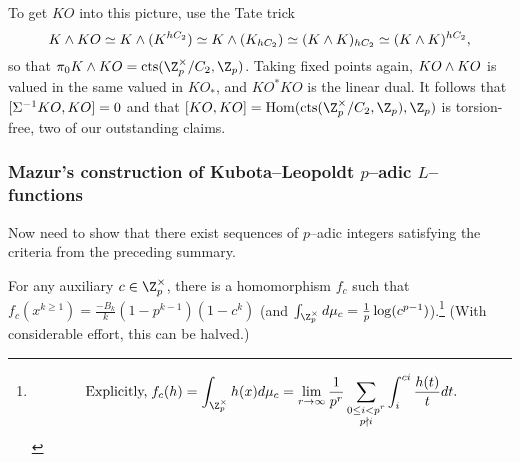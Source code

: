 To get $KO$ into this picture, use the Tate trick \[K \wedge KO \simeq K \wedge (K^{hC_2}) \simeq K \wedge (K_{hC_2}) \simeq (K \wedge K)_{hC_2} \simeq (K \wedge K)^{hC_2},\] so that $\pi_0 K \sm KO = \cts(\Z_p^\times / C_2, \Z_p)$.  Taking fixed points again, $KO \wedge KO$ is valued in the same valued in $KO_*$, and $KO^* KO$ is the linear dual.  It follows that $[\Sigma^{-1} KO, KO] = 0$ and that $[KO, KO] = \Hom(\cts(\Z_p^\times / C_2, \Z_p), \Z_p)$ is torsion-free, two of our outstanding claims.


\subsubsection{Mazur's construction of Kubota--Leopoldt $p$--adic $L$--functions}

Now need to show that there exist sequences of $p$--adic integers satisfying the criteria from the preceding summary.

\begin{theorem}[Mazur]
For any auxiliary $c \in \Z_p^\times$, there is a homomorphism $f_c$ such that $f_c(x^{k \ge 1}) = \frac{-B_k}{k}(1 - p^{k-1})(1 - c^k)$ (and $\int_{\Z_p^\times} d\mu_c = \frac{1}{p} \log(c^{p-1})$).\footnote{\[\text{Explicitly,\;} f_c(h) = \int_{\Z_p^\times} h(x) d\mu_c = \lim_{r \to \infty} \frac{1}{p^r} \sum_{\substack{0 \le i < p^r \\ p \nmid i}} \int_i^{ci} \frac{h(t)}{t} dt.\]} (With considerable effort, this can be halved.)
\end{theorem}


